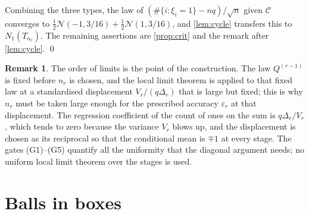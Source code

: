 \documentclass[11pt]{amsart}
\theoremstyle{definition}
\newtheorem{remark}[theorem]{Remark}
\newcommand{\Nor}{\mathcal{N}}
\newcommand{\Cond}{\mathcal{C}}
\begin{document}
Combining the three types, the law of $(\#\{i:\xi_i=1\}-nq)/\sqrt n$ given $\Cond$ converges to $\tfrac12\Nor(-1,3/16)+\tfrac12\Nor(1,3/16)$, and \cref{lem:cycle} transfers this to $N_1(T_{n_r})$. The remaining assertions are \cref{prop:crit} and the remark after \cref{lem:cycle}. \qed

\begin{remark}
The order of limits is the point of the construction. The law $Q^{(r-1)}$ is fixed before $n_r$ is chosen, and the local limit theorem is applied to that fixed law at a standardised displacement $V_r/(q\Delta_r)$ that is large but fixed; this is why $n_r$ must be taken large enough for the prescribed accuracy $\varepsilon_r$ at that displacement. The regression coefficient of the count of ones on the sum is $q\Delta_r/V_r$, which tends to zero because the variance $V_r$ blows up, and the displacement is chosen as its reciprocal so that the conditional mean is $\mp1$ at every stage. The gates (G1)--(G5) quantify all the uniformity that the diagonal argument needs; no uniform local limit theorem over the stages is used.
\end{remark}

\section{Balls in boxes}\label{sec:bb}
\end{document}
